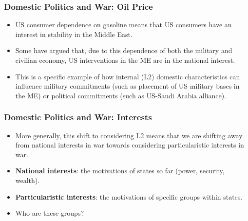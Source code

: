 \documentclass{beamer}
\begin{document}
\begin{frame} 
	\frametitle{\LARGE{Domestic Politics and War: Oil Price}}
	\begin{itemize}
		\item US consumer dependence on gasoline means that US consumers have an interest in stability in the Middle East. \pause
		\item Some have argued that, due to this dependence of both the military and civilian economy, US interventions in the ME are in the national interest. \pause
		\item This is a specific example of how internal (L2) domestic characteristics can influence military commitments (such as placement of US military bases in the ME) or political commitments (such as US-Saudi Arabia alliance).
	\end{itemize}
\end{frame}

\begin{frame} 
	\frametitle{\LARGE{Domestic Politics and War: Interests}}
	\begin{itemize}
		\item More generally, this shift to considering L2 means that we are shifting away from national interests in war towards considering particularistic interests in war. \pause
		\item \textbf{National interests}: the motivations of states so far (power, security, wealth). \pause
		\item \textbf{Particularistic interests}: the motivations of specific groups within states. \pause
		\item Who are these groups?
	\end{itemize}
\end{frame}
\end{document}

